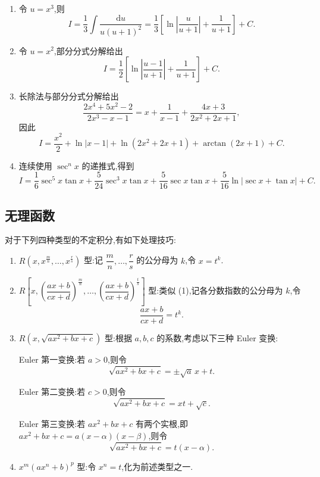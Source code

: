 \begin{solution}
    \begin{enumerate}
        \item 令 $u=x^3$,则
              \[
                  I=\dfrac{1}{3}\int\dfrac{\mathrm{d}u}{u(u+1)^2}
                  =\dfrac{1}{3}\left[\ln\left|\dfrac{u}{u+1}\right|+\dfrac{1}{u+1}\right]+C.
              \]
        \item 令 $u=x^2$,部分分式分解给出
              \[
                  I=\dfrac{1}{2}\left[\ln\left|\dfrac{u-1}{u+1}\right|+\dfrac{1}{u+1}\right]+C.
              \]
        \item 长除法与部分分式分解给出
              \[
                  \dfrac{2x^4+5x^2-2}{2x^3-x-1}
                  =x+\dfrac{1}{x-1}+\dfrac{4x+3}{2x^2+2x+1},
              \]
              因此
              \[
                  I=\dfrac{x^2}{2}+\ln|x-1|+\ln(2x^2+2x+1)
                  +\arctan(2x+1)+C.
              \]
        \item 连续使用 $\sec^n x$ 的递推式,得到
              \[
                  I=\dfrac{1}{6}\sec^5x\tan x+\dfrac{5}{24}\sec^3x\tan x
                  +\dfrac{5}{16}\sec x\tan x
                  +\dfrac{5}{16}\ln|\sec x+\tan x|+C.
              \]
    \end{enumerate}
\end{solution}



\subsection{无理函数}

\begin{proposition}[\markstar]
    对于下列四种类型的不定积分,有如下处理技巧:
    \begin{enumerate}
        \item $R\left(x,x^{\frac{m}{n}},\ldots,x^{\frac{r}{s}}\right)$ 型:记 $\dfrac{m}{n},\ldots,\dfrac{r}{s}$ 的公分母为 $k$,令 $x=t^k$.
        \item $R\left[x,\left(\dfrac{ax+b}{cx+d}\right)^{\frac{m}{n}},\ldots,
                      \left(\dfrac{ax+b}{cx+d}\right)^{\frac{t}{s}}\right]$ 型:类似 (1),记各分数指数的公分母为 $k$,令
              \[
                  \dfrac{ax+b}{cx+d}=t^k.
              \]
        \item $R(x,\sqrt{ax^2+bx+c})$ 型:根据 $a,b,c$ 的系数,考虑以下三种 Euler 变换:

              Euler 第一变换:若 $a>0$,则令
              \[
                  \sqrt{ax^2+bx+c}=\pm\sqrt{a}\,x+t.
              \]

              Euler 第二变换:若 $c>0$,则令
              \[
                  \sqrt{ax^2+bx+c}=xt+\sqrt{c}.
              \]

              Euler 第三变换:若 $ax^2+bx+c$ 有两个实根,即 $ax^2+bx+c=a(x-\alpha)(x-\beta)$,则令
              \[
                  \sqrt{ax^2+bx+c}=t(x-\alpha).
              \]
        \item $x^m(ax^n+b)^p$ 型:令 $x^n=t$,化为前述类型之一.
    \end{enumerate}
\end{proposition}

